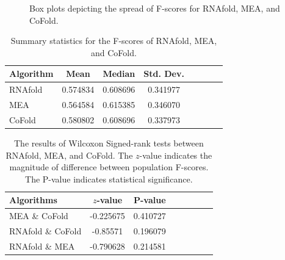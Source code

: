 \documentclass[12pt, a4paper]{article}
\begin{document}
\begin{figure}
\begin{center}
\end{center}
\caption{Box plots depicting the spread of F-scores for RNAfold, MEA, and CoFold.}
\label{fig:boxplots}
\end{figure}


\begin{table}
\centering
\begin{tabular}{l*{6}{c}r}
Algorithm	& Mean & Median & Std. Dev. \\
\hline
RNAfold &  0.574834    &    0.608696 & 0.341977   \\
MEA & 0.564584    &    0.615385  & 0.346070\\
CoFold & 0.580802  &     0.608696 & 0.337973  \\
\end{tabular}
\caption{Summary statistics for the F-scores of RNAfold, MEA, and CoFold.}
\label{tab:summarystats}
\end{table}


\begin{table}
\centering
\begin{tabular}{l*{6}{c}r}
Algorithms	& $z$-value & P-value \\
\hline 
MEA \& CoFold &  -0.225675    &    0.410727   \\
RNAfold \& CoFold &  -0.85571    &    0.196079  \\
RNAfold \& MEA &  -0.790628    &    0.214581  \\
\end{tabular}
\caption{The results of Wilcoxon Signed-rank tests between RNAfold, MEA, and CoFold. The $z$-value indicates the magnitude of difference between population F-scores. The P-value indicates statistical significance.}
\label{tab:wilcoxon}
\end{table}
\end{document}
